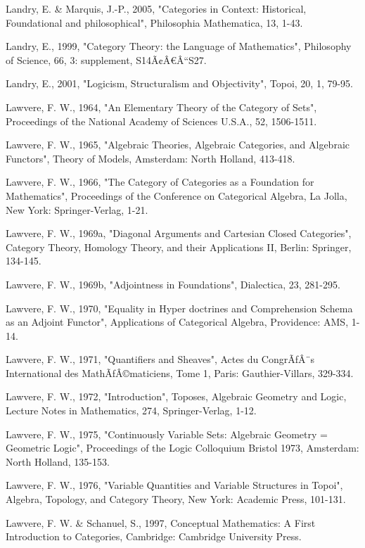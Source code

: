 \documentclass[12pt]{article}
\begin{document}
\begin{thebibliography}{199}
Landry, E. \& Marquis, J.-P., 2005, "Categories in Context: Historical, Foundational and philosophical", Philosophia Mathematica, 13, 1-43.  

Landry, E., 1999, "Category Theory: the Language of Mathematics", Philosophy of Science, 66, 3: supplement, S14Ã¢Â€Â“S27. 

Landry, E., 2001, "Logicism, Structuralism and Objectivity", Topoi, 20, 1, 79-95.  

Lawvere, F. W., 1964, "An Elementary Theory of the Category of Sets", Proceedings of the National Academy of Sciences U.S.A., 52, 1506-1511. 

Lawvere, F. W., 1965, "Algebraic Theories, Algebraic Categories, and Algebraic Functors", Theory of Models, Amsterdam: North Holland, 413-418.  

Lawvere, F. W., 1966, "The Category of Categories as a Foundation for Mathematics", Proceedings of the Conference on Categorical Algebra, La Jolla, New York: Springer-Verlag, 1-21. 

Lawvere, F. W., 1969a, "Diagonal Arguments and Cartesian Closed Categories", Category Theory, Homology Theory, and their Applications II, Berlin: Springer, 134-145.  

Lawvere, F. W., 1969b, "Adjointness in Foundations", Dialectica, 23, 281-295.  

Lawvere, F. W., 1970, "Equality in Hyper doctrines and Comprehension Schema as an Adjoint Functor", Applications of Categorical Algebra, Providence: AMS, 1-14.  

Lawvere, F. W., 1971, "Quantifiers and Sheaves", Actes du CongrÃƒÂ¨s International des MathÃƒÂ©maticiens, Tome 1, Paris: Gauthier-Villars, 329-334. 

Lawvere, F. W., 1972, "Introduction", Toposes, Algebraic Geometry and Logic, Lecture Notes in Mathematics, 274, Springer-Verlag, 1-12.  

Lawvere, F. W., 1975, "Continuously Variable Sets: Algebraic Geometry = Geometric Logic", Proceedings of the Logic Colloquium Bristol 1973, Amsterdam: North Holland, 135-153. 

Lawvere, F. W., 1976, "Variable Quantities and Variable Structures in Topoi", Algebra, Topology, and Category Theory, New York: Academic Press, 101-131. 

Lawvere, F. W. \& Schanuel, S., 1997, Conceptual Mathematics: A First Introduction to Categories, Cambridge: Cambridge University Press. 


\end{thebibliography}
\end{document}
